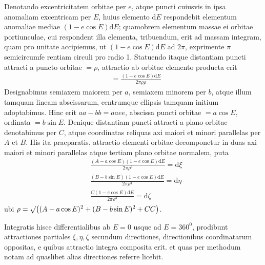 Denotando excentricitatem orbitae per $e$, atque puncti cuiusvis in ipsa anomaliam excentricam per $E$, huius elemento $\mathrm{d}E$ respondebit elementum anomaliae mediae $(1-e\cos E)\mathrm{d}E$; quamobrem elementum massae ei orbitae portiunculae, cui respondent illa elementa, tribuendum, erit ad massam integram, quam
pro unitate accipiemus, ut $(1-e\cos E)\mathrm{d}E$ ad $2\pi$, exprimente $\pi$ semicircumfe%
rentiam circuli pro radio 1. Statuendo itaque distantiam puncti attracti a puncto
orbitae $=\rho$, attractio ab orbitae elemento producta erit
\[
\begin{aligned}
&=\frac{(1-e\cos E)\mathrm{d}E}{2\pi\rho\rho}
\end{aligned}
\]
Designabimus semiaxem maiorem per $a$, semiaxem minorem per $b$, atque
illum tamquam lineam abscissarum, centrumque ellipsis tamquam initium adoptabimus. Hinc erit $aa-bb=aaee$, abscissa puncti orbitae $=a\cos E$, ordinata $=b\sin E$. Denique distantiam puncti attracti a plano orbitae denotabimus
per $C$, atque coordinatas reliquas axi maiori et minori parallelas per $A$ et $B$. His
ita praeparatis, attractio elementi orbitae decomponetur in duas axi maiori et minori parallelas atque tertiam plano orbitae normalem, puta
\[
\begin{aligned}
&\frac{(A-a\cos E)(1-e\cos E)\mathrm{d}E}{2\pi\rho^3}=\mathrm{d}\xi\\[6pt]
&\frac{(B-b\sin E)(1-e\cos E)\mathrm{d}E}{2\pi\rho^3}=\mathrm{d}\eta\\[6pt]
&\frac{C(1-e\cos E)\mathrm{d}E}{2\pi\rho^3}=\mathrm{d}\zeta
\end{aligned}
\]
ubi $\rho=\surd\bigl((A-a\cos E)^2+(B-b\sin E)^2+CC\bigr)$.

Integratis hisce differentialibus ab $E=0$ usque ad $E=360^{0}$, prodibunt
attractiones partiales $\xi,\eta,\zeta$ secundum directiones, directionibus coordinatarum
oppositas, e quibus attractio integra composita erit. et quas per methodum notam ad quaslibet alias directiones referre licebit.

